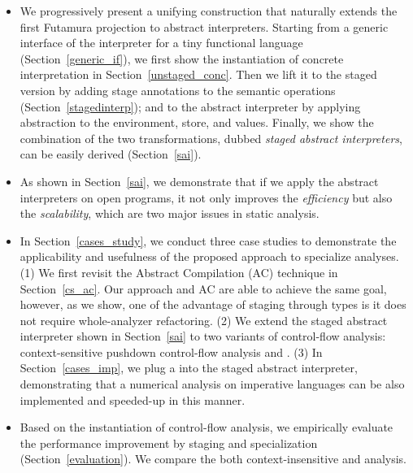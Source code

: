 \begin{itemize}
  \item We progressively present a unifying construction that naturally extends the
    first Futamura projection to abstract interpreters. Starting from a generic
    interface of the interpreter for a tiny functional language
    (Section~\ref{generic_if}), we first show the instantiation of concrete
    interpretation in Section~\ref{unstaged_conc}. Then we lift it to the staged
    version by adding stage annotations to the semantic operations
    (Section~\ref{stagedinterp}); and to the abstract interpreter by applying
    abstraction to the environment, store, and values. Finally, we show the
    combination of the two transformations, dubbed \textit{staged abstract
    interpreters}, can be easily derived (Section~\ref{sai}).
    
  \item {} As shown in Section~\ref{sai}, we demonstrate
    that if we apply the abstract interpreters on open programs, it not only
    improves the \textit{efficiency} but also the \textit{scalability}, which are
    two major issues in static analysis.
    
  \item In Section~\ref{cases_study}, we conduct three case studies to
    demonstrate the applicability and usefulness of the proposed approach to
    specialize analyses.
    (1) We first revisit the Abstract Compilation (AC)
    \cite{Boucher:1996:ACN:647473.727587} technique in Section~\ref{cs_ac}.
    Our approach and AC are able to achieve the same goal, however, as we show,
    one of the advantage of staging through types is it does not require
    whole-analyzer refactoring.
    (2) We extend the staged abstract interpreter shown in Section~\ref{sai} to
    two variants of control-flow analysis: context-sensitive pushdown
    control-flow analysis and .
    (3) In Section~\ref{cases_imp}, we plug a 
     into the staged abstract interpreter, demonstrating that a
    numerical analysis on imperative languages can be also implemented and
    speeded-up in this manner.
    
  \item Based on the instantiation of control-flow analysis, we empirically
    evaluate the performance improvement by staging and specialization
    (Section~\ref{evaluation}). We compare the both context-insensitive and
     analysis.
    
\end{itemize}
